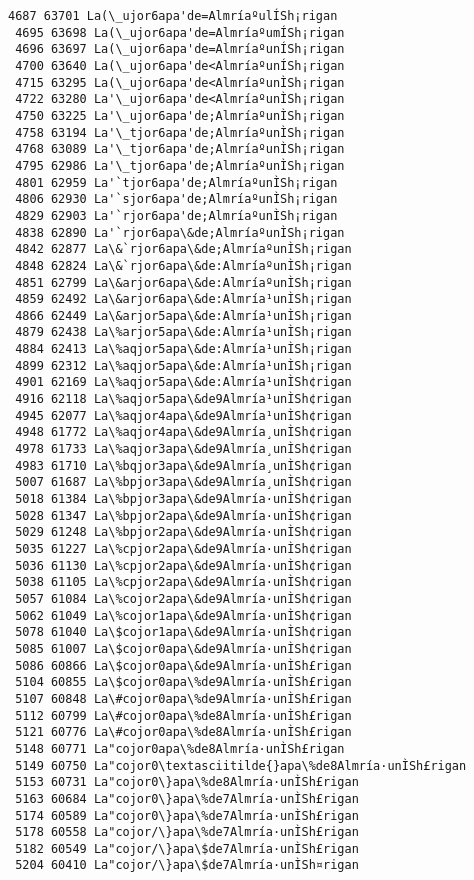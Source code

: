 \documentclass[11pt]{article}
\begin{document}
\begin{Verbatim}[commandchars=\\\{\}]
 4687 63701 La(\_ujor6apa'de=AlmríaºulÍSh¡rigan
 4695 63698 La(\_ujor6apa'de=AlmríaºumÍSh¡rigan
 4696 63697 La(\_ujor6apa'de=AlmríaºunÍSh¡rigan
 4700 63640 La(\_ujor6apa'de<AlmríaºunÍSh¡rigan
 4715 63295 La(\_ujor6apa'de<AlmríaºunÌSh¡rigan
 4722 63280 La'\_ujor6apa'de<AlmríaºunÌSh¡rigan
 4750 63225 La'\_ujor6apa'de;AlmríaºunÌSh¡rigan
 4758 63194 La'\_tjor6apa'de;AlmríaºunÌSh¡rigan
 4768 63089 La'\_tjor6apa'de;AlmríaºunÌSh¡rigan
 4795 62986 La'\_tjor6apa'de;AlmríaºunÌSh¡rigan
 4801 62959 La'`tjor6apa'de;AlmríaºunÌSh¡rigan
 4806 62930 La'`sjor6apa'de;AlmríaºunÌSh¡rigan
 4829 62903 La'`rjor6apa'de;AlmríaºunÌSh¡rigan
 4838 62890 La'`rjor6apa\&de;AlmríaºunÌSh¡rigan
 4842 62877 La\&`rjor6apa\&de;AlmríaºunÌSh¡rigan
 4848 62824 La\&`rjor6apa\&de:AlmríaºunÌSh¡rigan
 4851 62799 La\&arjor6apa\&de:AlmríaºunÌSh¡rigan
 4859 62492 La\&arjor6apa\&de:Almría¹unÌSh¡rigan
 4866 62449 La\&arjor5apa\&de:Almría¹unÌSh¡rigan
 4879 62438 La\%arjor5apa\&de:Almría¹unÌSh¡rigan
 4884 62413 La\%aqjor5apa\&de:Almría¹unÌSh¡rigan
 4899 62312 La\%aqjor5apa\&de:Almría¹unÌSh¡rigan
 4901 62169 La\%aqjor5apa\&de:Almría¹unÌSh¢rigan
 4916 62118 La\%aqjor5apa\&de9Almría¹unÌSh¢rigan
 4945 62077 La\%aqjor4apa\&de9Almría¹unÌSh¢rigan
 4948 61772 La\%aqjor4apa\&de9Almría¸unÌSh¢rigan
 4978 61733 La\%aqjor3apa\&de9Almría¸unÌSh¢rigan
 4983 61710 La\%bqjor3apa\&de9Almría¸unÌSh¢rigan
 5007 61687 La\%bpjor3apa\&de9Almría¸unÌSh¢rigan
 5018 61384 La\%bpjor3apa\&de9Almría·unÌSh¢rigan
 5028 61347 La\%bpjor2apa\&de9Almría·unÌSh¢rigan
 5029 61248 La\%bpjor2apa\&de9Almría·unÌSh¢rigan
 5035 61227 La\%cpjor2apa\&de9Almría·unÌSh¢rigan
 5036 61130 La\%cpjor2apa\&de9Almría·unÌSh¢rigan
 5038 61105 La\%cpjor2apa\&de9Almría·unÌSh¢rigan
 5057 61084 La\%cojor2apa\&de9Almría·unÌSh¢rigan
 5062 61049 La\%cojor1apa\&de9Almría·unÌSh¢rigan
 5078 61040 La\$cojor1apa\&de9Almría·unÌSh¢rigan
 5085 61007 La\$cojor0apa\&de9Almría·unÌSh¢rigan
 5086 60866 La\$cojor0apa\&de9Almría·unÌSh£rigan
 5104 60855 La\$cojor0apa\%de9Almría·unÌSh£rigan
 5107 60848 La\#cojor0apa\%de9Almría·unÌSh£rigan
 5112 60799 La\#cojor0apa\%de8Almría·unÌSh£rigan
 5121 60776 La\#cojor0apa\%de8Almría·unÌSh£rigan
 5148 60771 La"cojor0apa\%de8Almría·unÌSh£rigan
 5149 60750 La"cojor0\textasciitilde{}apa\%de8Almría·unÌSh£rigan
 5153 60731 La"cojor0\}apa\%de8Almría·unÌSh£rigan
 5163 60684 La"cojor0\}apa\%de7Almría·unÌSh£rigan
 5174 60589 La"cojor0\}apa\%de7Almría·unÌSh£rigan
 5178 60558 La"cojor/\}apa\%de7Almría·unÌSh£rigan
 5182 60549 La"cojor/\}apa\$de7Almría·unÌSh£rigan
 5204 60410 La"cojor/\}apa\$de7Almría·unÌSh¤rigan

\end{Verbatim}
\end{document}
